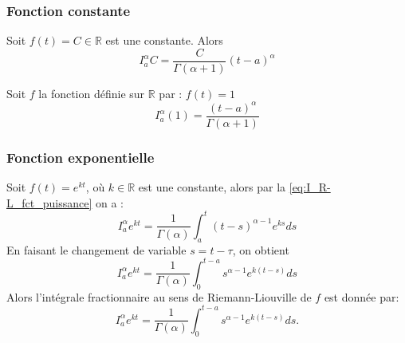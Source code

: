\subsubsection*{Fonction constante} 
Soit $f(t) =C \in \mathbb{R}$ est une constante. Alors 
\begin{equation} \label{integral_R-L}
    I_{a}^{\alpha} C= \frac{C}{\Gamma(\alpha + 1)}(t-a)^\alpha
\end{equation}
\begin{exemple}
    Soit $f$ la fonction définie sur $\mathbb{R}$ par : $f(t) = 1$\\
    \begin{equation*}
        I_a^{\alpha}(1) = \frac{(t-a)^\alpha}{\Gamma(\alpha + 1)}
    \end{equation*}
\end{exemple}
\subsubsection*{Fonction exponentielle} Soit $f(t) = e^{kt}$, où $k\in \mathbb{R}$ est une constante, alors par la \ref{eq:I_R-L_fct_puissance} on a :
\begin{equation*}
     I_{a}^{\alpha} e^{kt}=\frac{1}{\Gamma(\alpha)} \int_{a}^{t} (t-s)^{\alpha - 1}e^{ks}ds
\end{equation*}
En faisant le changement de variable $s=t-\tau$, on obtient
\begin{equation*}
    I_{a}^{\alpha} e^{kt}=\frac{1}{\Gamma(\alpha)} \int_{0}^{t-a} s^{\alpha - 1} e^{k(t-s)}ds
\end{equation*}
Alors l'intégrale fractionnaire au sens de Riemann-Liouville de $f$ est donnée par:
\begin{equation}\label{eq:I_R-L_f_expo}
    I_{a}^{\alpha} e^{kt}=\frac{1}{\Gamma(\alpha)} \int_{0}^{t-a} s^{\alpha - 1}e^{k(t-s)} ds.
\end{equation}
